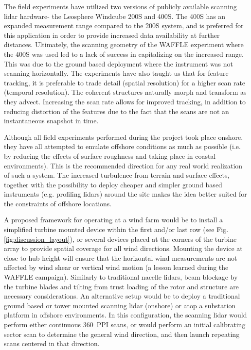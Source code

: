 The field experiments have utilized two versions of publicly available scanning lidar hardware- the Leosphere Windcube 200S and 400S. The 400S has an expanded measurement range compared to the 200S system, and is preferred for this application in order to provide increased data availability at further distances. Ultimately, the scanning geometry of the WAFFLE experiment where the 400S was used led to a lack of success in capitalizing on the increased range. This was due to the ground based deployment where the instrument was not scanning horizontally. The experiments have also taught us that for feature tracking, it is preferable to trade detail (spatial resolution) for a higher scan rate (temporal resolution). The coherent structures naturally morph and transform as they advect. Increasing the scan rate allows for improved tracking, in addition to reducing distortion of the features due to the fact that the scans are not an instantaneous snapshot in time.

Although all field experiments performed during the project took place onshore, they have all attempted to emulate offshore conditions as much as possible (i.e. by reducing the effects of surface roughness and taking place in coastal environments). This is the recommended direction for any real world realization of such a system. The increased turbulence from terrain and surface effects, together with the possibility to deploy cheaper and simpler ground based instruments (e.g. profiling lidars) around the site makes the idea better suited for the constraints of offshore locations.

A proposed framework for operating at a wind farm would be to install a simplified turbine mounted device within the first and/or last row (see Fig. \ref{fig:discussion_layout}), or several devices placed at the corners of the turbine array to provide spatial coverage for all wind directions. Mounting the device at close to hub height will ensure that the horizontal wind measurements are not affected by wind shear or vertical wind motion (a lesson learned during the WAFFLE campaign). Similarly to traditional nacelle lidars, beam blockage by the turbine blades and tilting from trust loading of the rotor and structure are necessary considerations. An alternative setup would be to deploy a traditional ground based or tower mounted scanning lidar (onshore) or atop a substation platform in offshore environments. In this configuration, the scanning lidar would perform either continuous 360\degree \ PPI scans, or would perform an initial calibrating sector scan to determine the general wind direction, and then launch repeating scans centered in that direction. 

